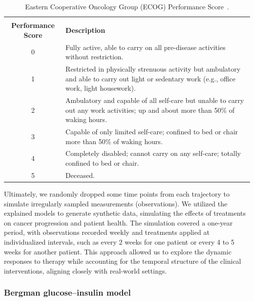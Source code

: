 \documentclass[preprint,12pt]{elsarticle}
\begin{document}
\begin{table}[h!]
    \centering
        \caption{Eastern Cooperative Oncology Group (ECOG) Performance Score~\citep{oken1982ecog}.}
\begin{small}
\begin{tabularx}{\textwidth}{cX} 
        \toprule
        \makecell{\textbf{ECOG} \\ \textbf{Performance Score}} & \textbf{Description} \\
        \midrule
        0 & Fully active, able to carry on all pre-disease activities without restriction. \\
        1 & Restricted in physically strenuous activity but ambulatory and able to carry out light or sedentary work (e.g., office work, light housework). \\
        2 & Ambulatory and capable of all self-care but unable to carry out any work activities; up and about more than 50\% of waking hours. \\
        3 & Capable of only limited self-care; confined to bed or chair more than 50\% of waking hours. \\
        4 & Completely disabled; cannot carry on any self-care; totally confined to bed or chair. \\
        5 & Deceased. \\
        \bottomrule
    \end{tabularx}
\end{small}    \label{tab:performace_score}
\end{table}

Ultimately, we randomly dropped some time points from each trajectory to simulate irregularly sampled measurements (observations).
We utilized the explained models to generate synthetic data, simulating the effects of treatments on cancer progression and patient health. The simulation covered a one-year period, with observations recorded weekly and treatments applied at individualized intervals, such as every 2 weeks for one patient or every 4 to 5 weeks for another patient. This approach allowed us to explore the dynamic responses to therapy while accounting for the temporal structure of the clinical interventions, aligning closely with real-world settings.

\subsubsection{Bergman glucose--insulin model}
\label{appndx:glucose_dataset}
\end{document}
